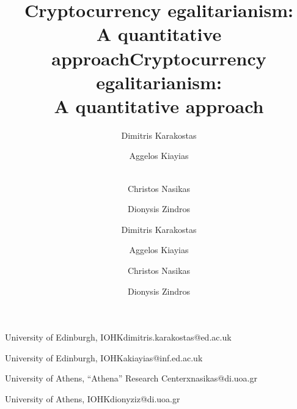 
\iflncs
\title{Cryptocurrency egalitarianism:\\A quantitative approach}
\else
\title{Cryptocurrency egalitarianism:\protect\\A quantitative approach} %

\fi

\ifanonymous
   \author{}
   \iflncs
     \institute{}
   \fi
\else
  \iflncs
     \author{
             Dimitris Karakostas  \and
             Aggelos Kiayias  \and\\
             Christos Nasikas  \and
             Dionysis Zindros 
     }
 \else
    \author{Dimitris Karakostas}{University of Edinburgh, IOHK}{dimitris.karakostas@ed.ac.uk}{}{}%

    \author{Aggelos Kiayias}{University of Edinburgh, IOHK}{akiayias@inf.ed.ac.uk}{}{}
    \author{Christos Nasikas}{University of Athens, ``Athena'' Research Center}{xnasikas@di.uoa.gr}{}{}
    \author{Dionysis Zindros}{University of Athens, IOHK}{dionyziz@di.uoa.gr}{}{}

  \fi
\fi
\iflncs
  \maketitle
\fi
